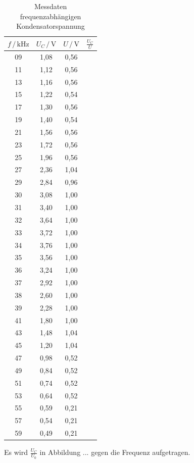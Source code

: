 \begin{table}
  \centering
  \caption{Messdaten frequenzabhängigen Kondensatorspannung}
  \label{tab:Messdaten2}
  \begin{tabular}{c c c c}
  \toprule
  $f \,/\, \si{\kilo\hertz}$ & $U_C \,/\, \si{\volt}$ & $U \,/\, \si{\volt}$ & $\frac{U_C}{U} $\\
  \midrule
  09 & 1,08 & 0,56\\
  11 & 1,12 & 0,56\\
  13 & 1,16 & 0,56\\
  15 & 1,22 & 0,54\\
  17 & 1,30 & 0,56\\
  19 & 1,40 & 0,54\\
  21 & 1,56 & 0,56\\
  23 & 1,72 & 0,56\\
  25 & 1,96 & 0,56\\
  27 & 2,36 & 1,04\\
  29 & 2,84 & 0,96\\
  30 & 3,08 & 1,00\\
  31 & 3,40 & 1,00\\
  32 & 3,64 & 1,00\\
  33 & 3,72 & 1,00\\
  34 & 3,76 & 1,00\\
  35 & 3,56 & 1,00\\
  36 & 3,24 & 1,00\\
  37 & 2,92 & 1,00\\
  38 & 2,60 & 1,00\\
  39 & 2,28 & 1,00\\
  41 & 1,80 & 1,00\\
  43 & 1,48 & 1,04\\
  45 & 1,20 & 1,04\\
  47 & 0,98 & 0,52\\
  49 & 0,84 & 0,52\\
  51 & 0,74 & 0,52\\
  53 & 0,64 & 0,52\\
  55 & 0,59 & 0,21\\
  57 & 0,54 & 0,21\\
  59 & 0,49 & 0,21\\
  \bottomrule
  \end{tabular}
  \end{table} 

Es wird $\frac{U_C}{U_0}$ in Abbildung ... gegen die Frequenz aufgetragen. 

